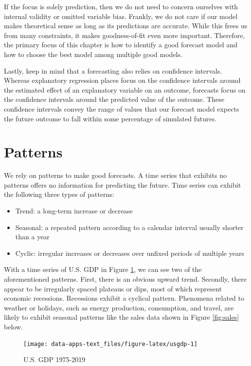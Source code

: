 \documentclass[
]{book}
\providecommand{\tightlist}{%
  \setlength{\itemsep}{0pt}\setlength{\parskip}{0pt}}
\begin{document}
If the focus is solely prediction, then we do not need to concern ourselves with internal validity or omitted variable bias. Frankly, we do not care if our model makes theoretical sense as long as its predictions are accurate. While this frees us from many constraints, it makes goodness-of-fit even more important. Therefore, the primary focus of this chapter is how to identify a good forecast model and how to choose the best model among multiple good models.

Lastly, keep in mind that a forecasting also relies on confidence intervals. Whereas explanatory regression places focus on the confidence intervals around the estimated effect of an explanatory variable on an outcome, forecasts focus on the confidence intervals around the predicted value of the outcome. These confidence intervals convey the range of values that our forecast model expects the future outcome to fall within some percentage of simulated futures.

\hypertarget{patterns}{%
\section{Patterns}\label{patterns}}

We rely on patterns to make good forecasts. A time series that exhibits no patterns offers no information for predicting the future. Time series can exhibit the following three types of patterns:

\begin{itemize}
\tightlist
\item
  Trend: a long-term increase or decrease
\item
  Seasonal: a repeated pattern according to a calendar interval usually shorter than a year
\item
  Cyclic: irregular increases or decreases over unfixed periods of multiple years
\end{itemize}

With a time series of U.S. GDP in Figure \ref{fig:usgdp}, we can see two of the aforementioned patterns. First, there is an obvious upward trend. Secondly, there appear to be irregularly spaced plateaus or dips, most of which represent economic recessions. Recessions exhibit a cyclical pattern. Phenomena related to weather or holidays, such as energy production, consumption, and travel, are likely to exhibit seasonal patterns like the sales data shown in Figure \ref{fig:sales} below.

\begin{figure}

{\centering \texttt{[image: data-apps-text\_files/figure-latex/usgdp-1]} 

}

\caption{U.S. GDP 1975-2019}\label{fig:usgdp}
\end{figure}
\end{document}
